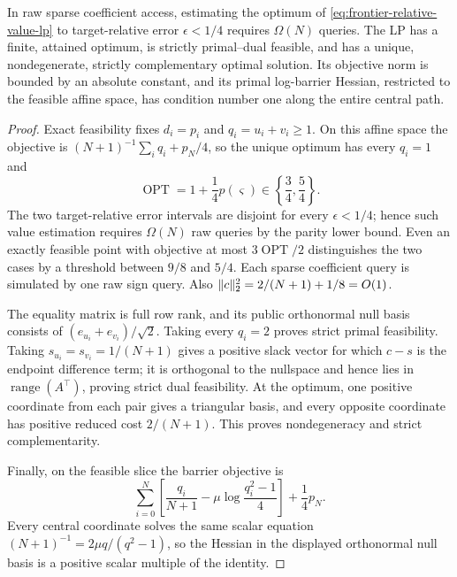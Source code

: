 \begin{theorem}
\label{thm:frontier-relative-value}
In raw sparse coefficient access, estimating the optimum of
\eqref{eq:frontier-relative-value-lp} to target-relative error
\(\epsilon<1/4\) requires \(\Omega(N)\) queries.  The LP has a finite,
attained optimum, is strictly primal--dual feasible, and has a unique,
nondegenerate, strictly complementary optimal solution.  Its objective norm
is bounded by an absolute constant, and its primal log-barrier Hessian,
restricted to the feasible affine space, has condition number one along the
entire central path.
\end{theorem}

\begin{proof}
Exact feasibility fixes \(d_i=p_i\) and \(q_i=u_i+v_i\geq1\).  On this
affine space the objective is
\((N+1)^{-1}\sum_iq_i+p_N/4\), so the unique optimum has every \(q_i=1\)
and
\begin{equation}
 \operatorname{OPT}=1+\frac14p(\varsigma)
 \in\left\{\frac34,\frac54\right\}.
 \label{eq:frontier-relative-value-gap}
\end{equation}
The two target-relative error intervals are disjoint for every
\(\epsilon<1/4\); hence such value estimation requires \(\Omega(N)\) raw
queries by the parity lower bound.  Even an exactly feasible point with
objective at most \(3\operatorname{OPT}/2\) distinguishes the two cases by
a threshold between \(9/8\) and \(5/4\).  Each
sparse coefficient query is simulated by one raw sign query.  Also
\(\lVert c\rVert_2^2=2/(N+1)+1/8=O(1)\).

The equality matrix is full row rank, and its public orthonormal null basis
consists of \((e_{u_i}+e_{v_i})/\sqrt2\).  Taking every \(q_i=2\) proves
strict primal feasibility.  Taking \(s_{u_i}=s_{v_i}=1/(N+1)\) gives a
positive slack vector for which \(c-s\) is the endpoint difference term; it is
orthogonal to the nullspace and hence lies in \(\operatorname{range}(A^\top)\),
proving strict dual feasibility.  At the optimum, one positive coordinate
from each pair gives a triangular basis, and every opposite coordinate has
positive reduced cost \(2/(N+1)\).  This proves nondegeneracy and strict
complementarity.

Finally, on the feasible slice the barrier objective is
\[
 \sum_{i=0}^N\left[\frac{q_i}{N+1}
 -\mu\log\frac{q_i^2-1}{4}\right]+\frac14p_N.
\]
Every central coordinate solves the same scalar equation
\((N+1)^{-1}=2\mu q/(q^2-1)\), so the Hessian in the displayed orthonormal
null basis is a positive scalar multiple of the identity.
\end{proof}

